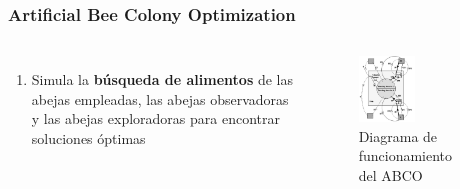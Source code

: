 \begin{frame}
  \frametitle{Artificial Bee Colony Optimization}
  \begin{columns}
    \begin{enumerate}
      \item Simula la \textbf{búsqueda de alimentos} de las abejas empleadas, las abejas observadoras y las abejas exploradoras para encontrar soluciones óptimas
    \end{enumerate}
    \begin{figure}
      \begin{center}
        \includegraphics[width=0.5\textwidth]{imagenes/chapter3/abco.png}
      \end{center}
      \caption{Diagrama de funcionamiento del ABCO \footnotemark[9]}
    \end{figure}
  \end{columns}
\end{frame}


